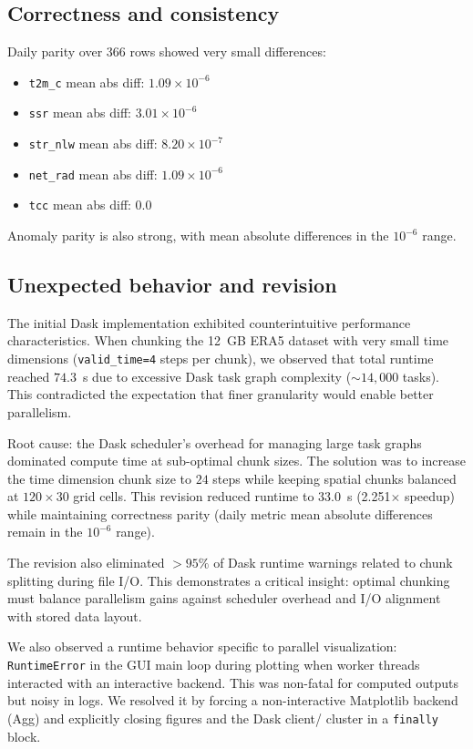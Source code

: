 \subsection{Correctness and consistency}
Daily parity over 366 rows showed very small differences:
\begin{itemize}
    \item \verb|t2m_c| mean abs diff: $1.09 \times 10^{-6}$
    \item \verb|ssr| mean abs diff: $3.01 \times 10^{-6}$
    \item \verb|str_nlw| mean abs diff: $8.20 \times 10^{-7}$
    \item \verb|net_rad| mean abs diff: $1.09 \times 10^{-6}$
    \item \verb|tcc| mean abs diff: 0.0
\end{itemize}

Anomaly parity is also strong, with mean absolute differences in the
$10^{-6}$ range.

\subsection{Unexpected behavior and revision}
The initial Dask implementation exhibited counterintuitive performance
characteristics. When chunking the 12~GB ERA5 dataset with very small time
dimensions (\verb|valid_time=4| steps per chunk), we observed that total
runtime reached $74.3$~s due to excessive Dask task graph complexity
($\sim 14,000$ tasks). This contradicted the expectation that finer
granularity would enable better parallelism.

Root cause: the Dask scheduler's overhead for managing large task graphs
dominated compute time at sub-optimal chunk sizes. The solution was to
increase the time dimension chunk size to $24$ steps while keeping spatial
chunks balanced at $120 \times 30$ grid cells. This revision reduced runtime
to $33.0$~s (2.251$\times$ speedup) while maintaining correctness parity
(daily metric mean absolute differences remain in the $10^{-6}$ range).

The revision also eliminated $>95\%$ of Dask runtime warnings related to
chunk splitting during file I/O. This demonstrates a critical insight:
optimal chunking must balance parallelism gains against scheduler overhead
and I/O alignment with stored data layout.

We also observed a runtime behavior specific to parallel visualization:
\verb|RuntimeError| in the GUI main loop during plotting when
worker threads interacted with an interactive backend. This was non-fatal for
computed outputs but noisy in logs. We resolved it by forcing a non-interactive
Matplotlib backend (Agg) and explicitly closing figures and the Dask client/
cluster in a \verb|finally| block.

